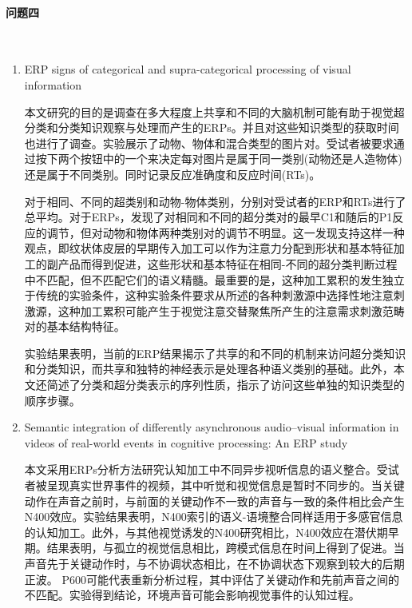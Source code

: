 \documentclass{hitreport}
\begin{document}
\paragraph{问题四}~{}

\begin{enumerate}
\item ERP signs of categorical and supra-categorical processing of visual information\cite{Zani2015}

\hspace{2em}本文研究的目的是调查在多大程度上共享和不同的大脑机制可能有助于视觉超分类和分类知识观察与处理而产生的ERPs。并且对这些知识类型的获取时间也进行了调查。实验展示了动物、物体和混合类型的图片对。受试者被要求通过按下两个按钮中的一个来决定每对图片是属于同一类别(动物还是人造物体)还是属于不同类别。同时记录反应准确度和反应时间(RTs)。

\hspace{2em}对于相同、不同的超类别和动物-物体类别，分别对受试者的ERP和RTs进行了总平均。对于ERPs，发现了对相同和不同的超分类对的最早C1和随后的P1反应的调节，但对动物和物体两种类别对的调节不明显。这一发现支持这样一种观点，即纹状体皮层的早期传入加工可以作为注意力分配到形状和基本特征加工的副产品而得到促进，这些形状和基本特征在相同-不同的超分类判断过程中不匹配，但不匹配它们的语义精髓。最重要的是，这种加工累积的发生独立于传统的实验条件，这种实验条件要求从所述的各种刺激源中选择性地注意刺激源，这种加工累积可能产生于视觉注意交替聚焦所产生的注意需求刺激范畴对的基本结构特征。

\hspace{2em}实验结果表明，当前的ERP结果揭示了共享的和不同的机制来访问超分类知识和分类知识，而共享和独特的神经表示是处理各种语义类别的基础。此外，本文还简述了分类和超分类表示的序列性质，指示了访问这些单独的知识类型的顺序步骤。

\item Semantic integration of differently asynchronous audio–visual information in videos of real-world events in cognitive processing: An ERP study\cite{Liu2011}

\hspace{2em}本文采用ERPs分析方法研究认知加工中不同异步视听信息的语义整合。受试者被呈现真实世界事件的视频，其中听觉和视觉信息是暂时不同步的。当关键动作在声音之前时，与前面的关键动作不一致的声音与一致的条件相比会产生N400效应。实验结果表明，N400索引的语义-语境整合同样适用于多感官信息的认知加工。此外，与其他视觉诱发的N400研究相比，N400效应在潜伏期早期。结果表明，与孤立的视觉信息相比，跨模式信息在时间上得到了促进。当声音先于关键动作时，与不协调状态相比，在不协调状态下观察到较大的后期正波。 P600可能代表重新分析过程，其中评估了关键动作和先前声音之间的不匹配。实验得到结论，环境声音可能会影响视觉事件的认知过程。


\end{enumerate}
\end{document}
